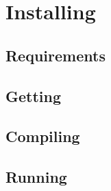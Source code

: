 \chapter{Installing}

\section{Requirements}

\section{Getting}

\section{Compiling}

\section{Running}

